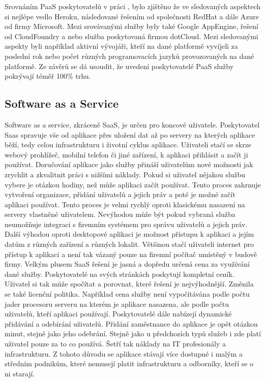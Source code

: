 	      Srovnáním PaaS poskytovatelů v práci \cite{lucassen2013ecosystem}, bylo zjištěno že ve sledovaných aspektech si nejlépe vedlo Heroku, následované řešením od společnosti RedHat a dále Azure od firmy Microsoft. Mezi srovávanými služby byly také Google AppEngine, řešení od CloudFoundry a nebo služba poskytovaná firmou dotCloud. Mezi sledovanými aspekty byli například aktivní vývojáři, kteří na dané platformě vyvíjeli za poslední rok nebo počet různých programovacích jazyků provozovaných na dané platformě. Ze závěrů se dá usoudit, že uvedení poskytovatelé PaaS služby pokrývají téměř 100\% trhu.

\subsection{Software as a Service}
Software as a service, zkráceně SaaS, je určen pro koncové uživatele. Poskytovatel Saas spravuje vše od aplikace přes uložení dat až po servery na kterých aplikace běží, tedy celou infrastrukturu i životní cyklus aplikace.  Uživateli stačí se skrze webový prohlížeč, mobilní telefon či jiné zařízení, k aplikaci přihlásit a začít ji používat.
Doručování aplikace jako služby přináší uživatelům nové možnosti jak zrychlit a zkvalitnit práci s nižšími náklady. Pokud si uživatel nějakou službu vybere je otázkou hodiny, než může aplikaci začít používat. Tento proces zahrnuje vytvoření organizace, přidání uživatelů a jejich práv a poté je možné začít aplikaci používat. Tento proces je velmi rychlý oproti klasickému nasazení na servery vlastněné uživatelem. Nevýhodou může být pokud vybraná služba neumožňuje integraci s firemním systémem pro správu uživatelů a jejich práv. Další výhodou oproti desktopové aplikaci je možnost přístupu k aplikaci a jejím datům z různých zařízení a různých lokalit. Většinou stačí uživateli internet pro přístup k aplikaci a není tak vázaný pouze na firemní počítač umístěný v budově firmy.\newline
Velkým plusem SaaS řešení je jasná a dopředu určená cena za využívání dané služby. Poskytovatelé na svých stránkách poskytují kompletní ceník. Uživatel si tak může spočítat a porovnat, které řešení je nejvýhodnější. Změnila se také licenční politika. Například cena služby není vypočítávána podle počtu jader procesoru serveru na kterém je aplikace nasazena, ale podle počtu uživatelů, kteří aplikaci používají. Poskytovatelé dále nabízejí dynamické přidávání a odebírání uživatelů. Přidání zaměstnance do aplikace je opět otázkou minut, stejně jako jeho odebrání. Stejně jako u předchozích typů služeb i zde platí uživatel pouze za to co používá. Šetří tak náklady na IT profesionály a infrastrukturu. Z tohoto důvodu se aplikace stávají více dostupné i malým a středním podnikům, které nemusejí platit infrastrukturu a odborníky, kteří se o ni starají.\newline 
